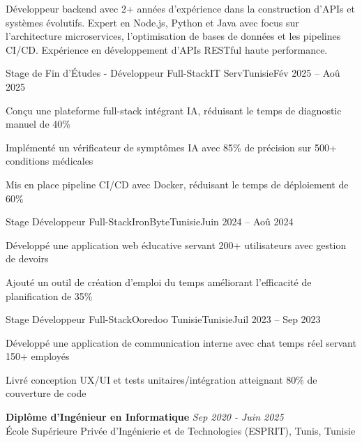 \documentclass[11pt,a4paper]{article}
\begin{document}
\makecvheader
\makecontactinfo

Développeur backend avec 2+ années d'expérience dans la construction d'APIs et systèmes évolutifs. Expert en Node.js, Python et Java avec focus sur l'architecture microservices, l'optimisation de bases de données et les pipelines CI/CD. Expérience en développement d'APIs RESTful haute performance.


\begin{internship}{Stage de Fin d'Études - Développeur Full-Stack}{IT Serv}{Tunisie}{Fév 2025 -- Aoû 2025}{}
  \item Conçu une plateforme full-stack intégrant IA, réduisant le temps de diagnostic manuel de 40\%
  \item Implémenté un vérificateur de symptômes IA avec 85\% de précision sur 500+ conditions médicales
  \item Mis en place pipeline CI/CD avec Docker, réduisant le temps de déploiement de 60\%
\end{internship}

\begin{internship}{Stage Développeur Full-Stack}{IronByte}{Tunisie}{Juin 2024 -- Aoû 2024}{}
  \item Développé une application web éducative servant 200+ utilisateurs avec gestion de devoirs
  \item Ajouté un outil de création d'emploi du temps améliorant l'efficacité de planification de 35\%
\end{internship}

\begin{internship}{Stage Développeur Full-Stack}{Ooredoo Tunisie}{Tunisie}{Juil 2023 -- Sep 2023}{}
  \item Développé une application de communication interne avec chat temps réel servant 150+ employés
  \item Livré conception UX/UI et tests unitaires/intégration atteignant 80\% de couverture de code
\end{internship}

\textbf{Diplôme d'Ingénieur en Informatique} \hfill \textit{Sep 2020 - Juin 2025}\\[-2pt]
École Supérieure Privée d'Ingénierie et de Technologies (ESPRIT), Tunis, Tunisie
\end{document}
